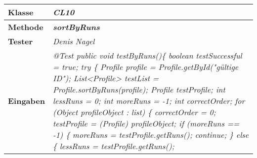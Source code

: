 \begin{longtable}{|p{4cm}|p{11cm}|}
\hline
\textbf{Klasse} & \textit{\textbf{CL10}} \\
\hline
\textbf{Methode} & \textit{\textbf{sortByRuns}} \\
\hline
\textbf{Tester} & \textit{Denis Nagel} \\
\hline
\textbf{Eingaben} & \textit{
@Test \newline
public void testByRuns()\{ \newline
\hspace*{3mm}    boolean testSuccessful = true; \newline
\hspace*{3mm}    try \{ \newline
\hspace*{6mm}      	 Profile profile = Profile.getById("gültige ID"); \newline
\hspace*{6mm}        List<Profile> testList = Profile.sortByRuns(profile); \newline
\hspace*{6mm}        Profile testProfile; \newline
\hspace*{6mm}        int lessRuns = 0; \newline
\hspace*{6mm}        int moreRuns = -1; \newline
\hspace*{6mm}        int correctOrder; \newline
\hspace*{6mm}        for (Object profileObject : list) \{ \newline
\hspace*{9mm}            correctOrder = 0; \newline
\hspace*{9mm}            testProfile = (Profile) profileObject; \newline
\hspace*{9mm}            if (moreRuns == -1) \{ \newline
\hspace*{12mm}                moreRuns = testProfile.getRuns(); \newline
\hspace*{12mm}                continue; \newline
\hspace*{9mm}            \} else \{ \newline
\hspace*{12mm}                lessRuns = testProfile.getRuns(); \newline
}
\end{longtable}
